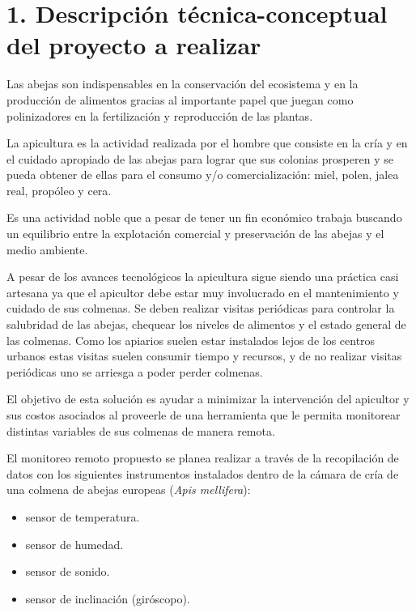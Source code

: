 \documentclass[
11pt, %
codirector, %
]{charter}
\begin{document}
\section{1. Descripción técnica-conceptual del proyecto a realizar}
\label{sec:descripcion}

Las abejas son indispensables en la conservación del ecosistema y en la producción de alimentos gracias al importante papel que juegan como polinizadores en la fertilización y reproducción de las plantas.

La apicultura es la actividad realizada por el hombre que consiste en la cría y en el cuidado apropiado de las abejas para lograr que sus colonias prosperen y se pueda obtener de ellas para el consumo y/o comercialización: miel, polen, jalea real, propóleo y cera.

Es una actividad noble que a pesar de tener un fin económico trabaja buscando un equilibrio entre la explotación comercial y preservación de las abejas y el medio ambiente.

A pesar de los avances tecnológicos la apicultura sigue siendo una práctica casi artesana ya que el apicultor debe estar muy involucrado en el mantenimiento y cuidado de sus colmenas. Se deben realizar visitas periódicas para controlar la salubridad de las abejas, chequear los niveles de alimentos y el estado general de las colmenas.
Como los apiarios suelen estar instalados lejos de los centros urbanos estas visitas suelen consumir tiempo y recursos, y de no realizar visitas periódicas uno se arriesga a poder perder colmenas.

El objetivo de esta solución es ayudar a minimizar la intervención del apicultor y sus costos asociados al proveerle de una herramienta que le permita monitorear distintas variables de sus colmenas de manera remota.


El monitoreo remoto propuesto se planea realizar a través de la recopilación de datos con los siguientes instrumentos instalados dentro de la cámara de cría de una colmena de abejas europeas (\textit{Apis mellifera}):
\begin{itemize}
\item sensor de temperatura. 
\item sensor de humedad.
\item sensor de sonido.
\item sensor de inclinación (giróscopo).
\end{itemize}
\end{document}
